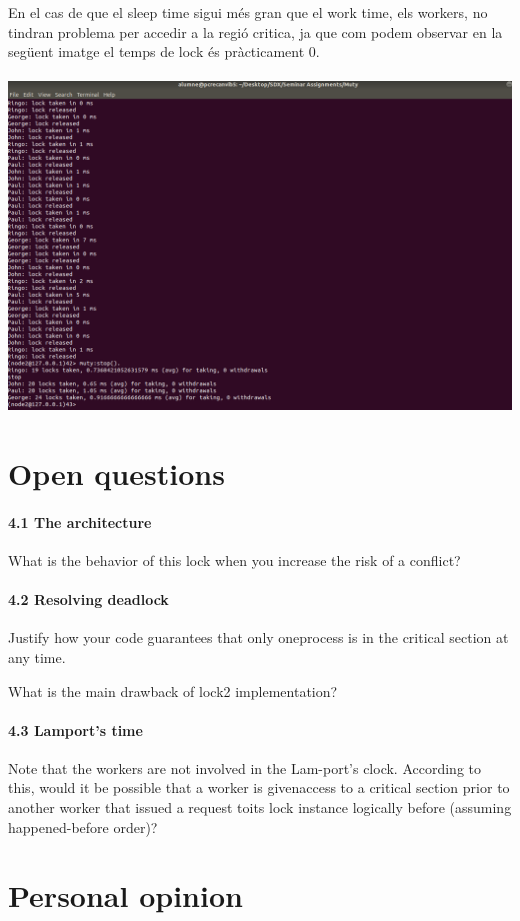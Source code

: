 \documentclass[a4paper, 10pt]{article}
\begin{document}
\begin{enumerate}
En el cas de que el sleep time sigui més gran que el work time, els workers, no tindran problema per accedir a la regió critica, ja que com podem observar en la següent imatge el temps de lock és pràcticament 0.\\\\


\includegraphics[width=\textwidth]{lamp-2}

\end{enumerate}

\newpage
\section{Open questions}
\paragraph[bold]{4.1 The architecture}
\item What is the behavior of this lock when you increase the risk of a conflict?


\paragraph[bold]{4.2 Resolving deadlock}
\item Justify how your code guarantees that only oneprocess is in the critical section at any time.

\item What is the main drawback of lock2 implementation?

\paragraph[bold]{4.3 Lamport's time}
\item Note that the workers are not involved in the Lam-port’s clock.  According to this, would it be possible that a worker is givenaccess to a critical section prior to another worker that issued a request toits lock instance logically before (assuming happened-before order)?


\newpage
\section{Personal opinion}
\end{document}
